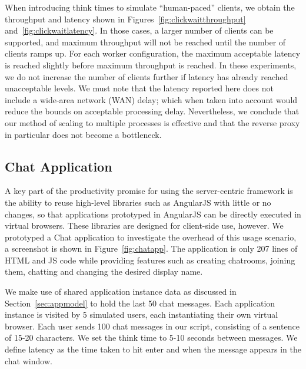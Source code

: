 When introducing think times to simulate ``human-paced'' clients, we obtain the
throughput and latency shown in Figures~\ref{fig:clickwaitthroughput} 
and~\ref{fig:clickwaitlatency}.  In those cases, a larger number of clients can be
supported, and maximum throughput will not be reached until the number of
clients ramps up.  For each worker configuration, the maximum acceptable latency 
is reached slightly before maximum throughput is reached.  In these experiments,
we do not increase the number of clients further if latency has already reached
unacceptable levels.
We must note that the latency reported here does not include a wide-area network (WAN) delay;
which when taken into account would reduce the bounds on acceptable processing delay.
Nevertheless, we conclude that our method of scaling to multiple processes is effective 
and that the reverse proxy in particular does not become a bottleneck.

\subsection{Chat Application} 

A key part of the productivity promise for using the server-centric \cb framework
is the ability to reuse high-level libraries such as AngularJS with little or
no changes, so that applications prototyped in AngularJS can be directly
executed in virtual browsers.  These libraries are designed for client-side
use, however.  We prototyped a Chat application to investigate the overhead
of this usage scenario, a screenshot is shown in Figure~\ref{fig:chatapp}.  
The application is only 207 lines of HTML and JS code while providing features such as 
creating chatrooms, joining them, chatting and changing the desired display name.

\chatroomfig{}

We make use of shared application instance data as discussed in Section~\ref{sec:appmodel}
to hold the last 50 chat messages.  Each application instance is visited by 5 simulated users,
each instantiating their own virtual browser.  Each user sends 100 chat messages in our
script, consisting of a sentence of 15-20 characters.  We set the think time to 5-10 seconds
between messages.  We define latency as the time taken to hit enter and when the  message
appears in the chat window.

\angularchatlatency{}

